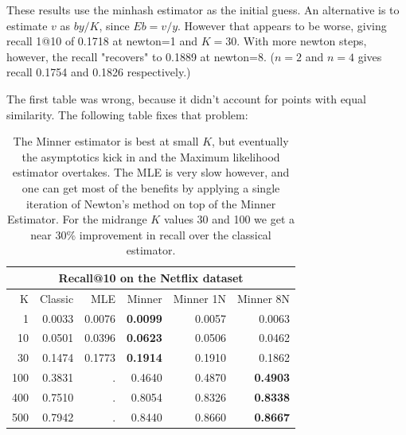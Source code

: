 These results use the minhash estimator as the initial guess.
An alternative is to estimate $v$ as $by/K$, since $Eb=v/y$.
However that appears to be worse, giving recall 1@10 of 0.1718 at newton=1 and $K=30$.
With more newton steps, however, the recall "recovers" to 0.1889 at newton=8.
($n=2$ and $n=4$ gives recall 0.1754 and 0.1826 respectively.)

%

The first table was wrong, because it didn't account for points with equal similarity.
The following table fixes that problem:
\begin{table}
\centering
 \begin{tabular}{|r| r r r r r|} 
 \hline
     \multicolumn{6}{|c|}{Recall@10 on the Netflix dataset} \\
 \hline
 K  & Classic & MLE & Minner & Minner 1N & Minner 8N \\
 \hline
    1 & 0.0033 & 0.0076 & \textbf{ 0.0099} & 0.0057 & 0.0063 \\
  10 & 0.0501 & 0.0396 & \textbf{ 0.0623} & 0.0506 & 0.0462 \\
  30 & 0.1474 & 0.1773 & \textbf{ 0.1914} & 0.1910 & 0.1862 \\
 100 & 0.3831 &      . & 0.4640 & 0.4870 & \textbf{ 0.4903} \\
 400 & 0.7510 &      . & 0.8054 & 0.8326 & \textbf{ 0.8338} \\
 500 & 0.7942 &      . & 0.8440 & 0.8660 & \textbf{ 0.8667} \\
  \hline
 \end{tabular}
 \caption{The Minner estimator is best at small $K$, but eventually the asymptotics kick in and the Maximum likelihood estimator overtakes. The MLE is very slow however, and one can get most of the benefits by applying a single iteration of Newton's method on top of the Minner Estimator.
    For the midrange $K$ values 30 and 100 we get a near 30\% improvement in recall over the classical estimator.
 }
 \label{tab:netflix}
\end{table}

